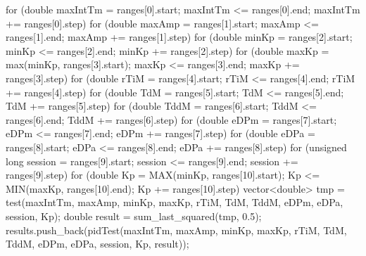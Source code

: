 \documentclass[a4paper,12pt]{article}
\begin{document}
\begin{lstlising}[language=C++]
\begin{lstlising}[language=C++]
{        for (double maxIntTm = ranges[0].start; maxIntTm <= ranges[0].end; maxIntTm += ranges[0].step)
        {
                for (double maxAmp = ranges[1].start; maxAmp <= ranges[1].end; maxAmp += ranges[1].step)
                {
                        for (double minKp = ranges[2].start; minKp <= ranges[2].end; minKp += ranges[2].step)
                        {
                                for (double maxKp = max(minKp, ranges[3].start);
                                         maxKp <= ranges[3].end; maxKp += ranges[3].step)
                                {
                                        for (double rTiM = ranges[4].start; rTiM <= ranges[4].end; rTiM += ranges[4].step)
                                        {
                                                for (double TdM = ranges[5].start; TdM <= ranges[5].end; TdM += ranges[5].step)
                                                {
                                                        for (double TddM = ranges[6].start; TddM <= ranges[6].end; TddM += ranges[6].step)
                                                        {
                                                                for (double eDPm = ranges[7].start; eDPm <= ranges[7].end; eDPm += ranges[7].step)
                                                                {
                                                                        for (double eDPa = ranges[8].start; eDPa <= ranges[8].end; eDPa += ranges[8].step)
                                                                        {
                                                                                for (unsigned long session = ranges[9].start; session <= ranges[9].end; session += ranges[9].step)
                                                                                {
                                                                                        for (double Kp = MAX(minKp, ranges[10].start);
                                                                                                 Kp <= MIN(maxKp, ranges[10].end); Kp += ranges[10].step)
                                                                                        {
                                                                                                vector<double> tmp = test(maxIntTm, maxAmp, minKp, maxKp, rTiM, TdM, TddM, eDPm, eDPa, session, Kp);
                                                                                                double result = sum_last_squared(tmp, 0.5);
                                                                                                results.push_back(pidTest({maxIntTm, maxAmp, minKp, maxKp, rTiM, TdM, TddM, eDPm, eDPa, session, Kp, result}));
}}}}}}}}}}}}
\end{lstlising}
\end{lstlising}
\end{document}
